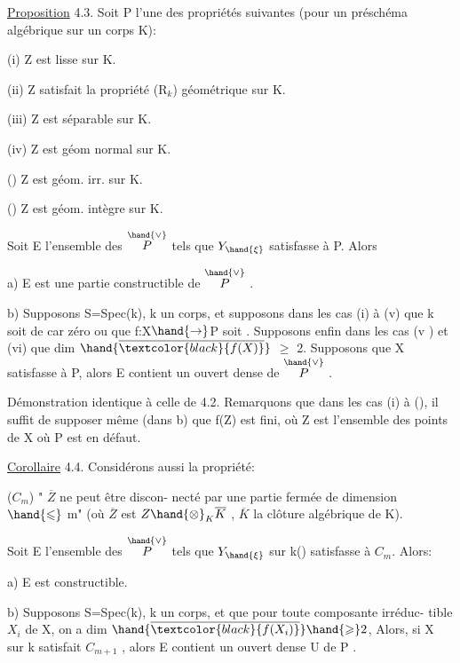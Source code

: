 
\uline{Proposition} 4.3.    Soit P l'une des propriétés  suivantes (pour un
préschéma algébrique sur un corps K):

(i)  Z  est lisse sur K.

(ii)  Z satisfait la propriété (R$_k$) géométrique sur K.

(iii)  Z est séparable sur K.

(iv)  Z est géom normal sur K.

\placedmargin{$\uparrow$}()  Z  est géom. irr.  sur K.

()  Z est géom. intègre  sur K.

Soit E l'ensemble des \hand{$\xi \in$} $\overset{\hand{\vee}}{P}$  tels que $Y_{\hand{\xi}}$ satisfasse à P. Alors

a)  E est une partie constructible de $\overset{\hand{\vee}}{P}$ .

b)  Supposons  S=Spec(k), k un corps, et supposons dans les cas (i) à (v) que k soit de
car zéro  ou que f:X$\hand{\rightarrow}$P  soit . Supposons enfin dans les
cas (v ) et (vi)  que dim $\hand{\overline{\textcolor{black}{f(X)}}}$ $\geqslant$ 2.  Supposons que X satisfasse à P,
alors E contient un ouvert  dense de $\overset{\hand{\vee}}{P}$ .

Démonstration identique à celle de 4.2.   Remarquons que dans
les cas (i) à (), il suffit de supposer même (dans b) que  f(Z) est
fini, où Z est l'ensemble des points de X où  P est en défaut.

\uline{Corollaire} 4.4.    Considérons aussi la propriété:

($C_m^{}$)   " $\overline{Z}$ ne peut être discon-%
necté par une partie fermée de dimension  $\hand{\leqslant}$ m" (où $\overline{Z}$ est $Z\hand{\otimes}_K\overline{K}$ , $\overline{K}$
la clôture  algébrique de K).

Soit E l'ensemble des \hand{$\xi \in$} $\overset{\hand{\vee}}{P}$  tels que  $Y_{\hand{\xi}}$ sur k(\hand{$\xi$}) satisfasse à $C_m$.
Alors:

a)  E est constructible.

b)   Supposons S=Spec(k), k un corps, et que  pour toute composante irréduc-%
tible  $X_i$ de X, on a dim $\hand{\overline{\textcolor{black}{f(X_i)}}} \hand{\geqslant} 2$, Alors, si X sur k satisfait $C_{m+1}$ ,
alors E\hand{$_{\xi}$} contient un ouvert dense U de P .



